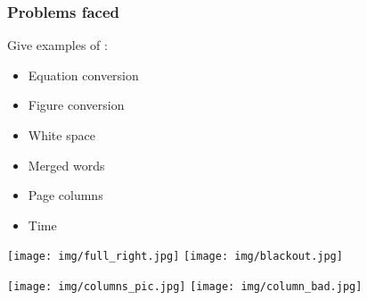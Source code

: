 \documentclass{beamer}
\begin{document}
\begin{frame}
\frametitle{Problems faced}

Give examples of :
\begin{itemize}
\item Equation conversion
\item Figure conversion
\item White space
\item Merged words
\item Page columns
\item Time
\end{itemize}
\end{frame}

\begin{frame}
\texttt{[image: img/full\_right.jpg]}
\texttt{[image: img/blackout.jpg]}
\end{frame}

\begin{frame}
\begin{center}
\texttt{[image: img/columns\_pic.jpg]}
\vspace{0.2in}
\texttt{[image: img/column\_bad.jpg]}
\end{center}
\end{frame}
\end{document}
